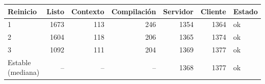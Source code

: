 \begin{tabular}{lrrrrrl}
\toprule
Reinicio & Listo & Contexto & Compilación & Servidor & Cliente & Estado \\
\midrule
1 & 1673 & 113 & 246 & 1354 & 1364 & ok \\
2 & 1604 & 118 & 206 & 1365 & 1374 & ok \\
3 & 1092 & 111 & 204 & 1369 & 1377 & ok \\
\midrule Estable (mediana) & -- & -- & -- & 1368 & 1377 & ok \\
\bottomrule
\end{tabular}

